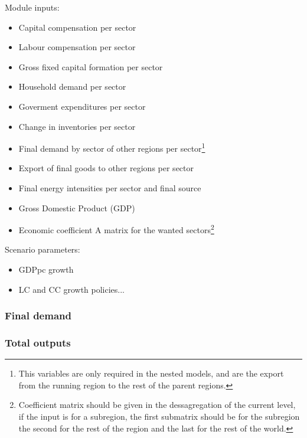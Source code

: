 

Module inputs:
\begin{itemize}
    \item Capital compensation per sector
    \item Labour compensation per sector
    \item Gross fixed capital formation per sector
    \item Household demand per sector
    \item Goverment expenditures per sector
    \item Change in inventories per sector
    \item Final demand by sector of other regions per sector\footnote{\label{fnote:regional-var}This variables are only required in the nested models, and are the export from the running region to the rest of the parent regions.}
    \item Export of final goods to other regions per sector
    \item Final energy intensities per sector and final source
    \item Gross Domestic Product (GDP)
    \item Economic coefficient A matrix for the wanted sectors\footnote{Coefficient matrix should be given in the dessagregation of the current level, if the input is for a subregion, the first submatrix should be for the subregion the second for the rest of the region and the last for the rest of the world.}
\end{itemize}

Scenario parameters:
\begin{itemize}
    \item GDPpc growth
    \item LC and CC growth policies...
\end{itemize}

\subsubsection{Final demand}
    \label{se:economy-final_demand}
    

 \subsubsection{Total outputs}
    \label{se:economy-total_outputs}
    
